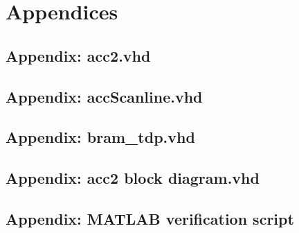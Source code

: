 \appendix
\renewcommand{\thesection}{\Alph{section}}
\section{Appendices}

\subsection{Appendix: acc2.vhd}
\label{app:acc2}		


\newpage
\subsection{Appendix: accScanline.vhd}
\label{app:accScanline}		


\newpage
\subsection{Appendix: bram\_tdp.vhd}
\label{app:bram}	


\newpage
\subsection{Appendix: acc2 block diagram.vhd}
\label{app:accBlockDiagram}


\newpage
\subsection{Appendix: MATLAB verification script}
\label{app:Matlab}
\lstset{language=Matlab} 
